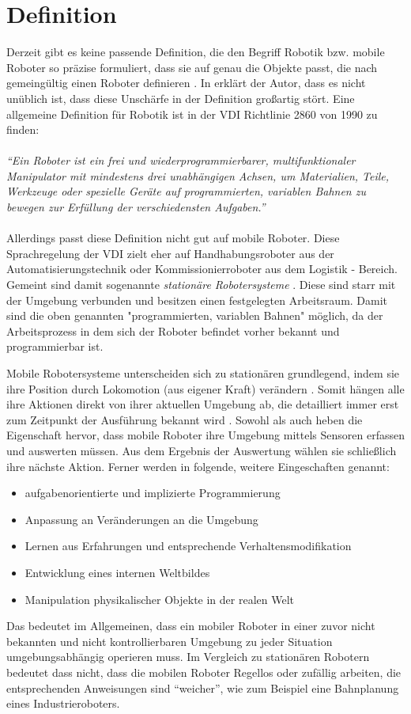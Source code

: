 \section{Definition}
Derzeit gibt es keine passende Definition, die den Begriff Robotik bzw. mobile Roboter so präzise formuliert, dass sie auf genau die Objekte passt, die nach gemeingültig einen Roboter definieren \cite{hertzberg2009mobile}. In \cite{hertzberg2009mobile} erklärt der Autor, dass es nicht unüblich ist, dass diese Unschärfe in der Definition großartig stört. Eine allgemeine Definition für Robotik ist in der \ac{VDI} Richtlinie 2860 von 1990 zu finden:
\\
\\
\textit{"`Ein Roboter ist ein frei und wiederprogrammierbarer, multifunktionaler Manipulator mit mindestens drei unabhängigen Achsen, um Materialien, Teile, Werkzeuge oder spezielle Geräte auf programmierten,
variablen Bahnen zu bewegen zur Erfüllung der verschiedensten Aufgaben."'}
\\
\\
Allerdings passt diese Definition nicht gut auf mobile Roboter. Diese Sprachregelung der \ac{VDI} zielt eher auf Handhabungsroboter aus der Automatisierungstechnik oder Kommissionierroboter aus dem Logistik - Bereich. Gemeint sind damit sogenannte \textit{stationäre Robotersysteme} \cite{Haun2007}. Diese sind starr mit der Umgebung verbunden und besitzen einen festgelegten Arbeitsraum. Damit sind die oben genannten "programmierten, variablen Bahnen" möglich, da der Arbeitsprozess in dem sich der Roboter befindet vorher bekannt und programmierbar ist. 

Mobile Robotersysteme unterscheiden sich zu stationären grundlegend, indem sie ihre Position durch Lokomotion (aus eigener Kraft) verändern \cite{Haun2007}. Somit hängen alle ihre Aktionen direkt von ihrer aktuellen Umgebung ab, die detailliert immer erst zum Zeitpunkt der Ausführung bekannt wird \cite{hertzberg2009mobile}. Sowohl \cite{hertzberg2009mobile} als auch \cite{Haun2007} heben die Eigenschaft hervor, dass mobile Roboter ihre Umgebung mittels Sensoren erfassen und auswerten müssen. Aus dem Ergebnis der Auswertung wählen sie schließlich ihre nächste Aktion. Ferner werden in \cite{Haun2007} folgende, weitere Eingeschaften genannt:
\begin{itemize}
\item aufgabenorientierte und implizierte Programmierung
\item Anpassung an Veränderungen an die Umgebung
\item Lernen aus Erfahrungen und entsprechende Verhaltensmodifikation
\item Entwicklung eines internen Weltbildes
\item Manipulation physikalischer Objekte in der realen Welt
\end{itemize}
Das bedeutet im Allgemeinen, dass ein mobiler Roboter in einer zuvor nicht bekannten und nicht kontrollierbaren Umgebung zu jeder Situation umgebungsabhängig operieren muss. Im Vergleich zu stationären Robotern bedeutet dass nicht, dass die mobilen Roboter Regellos oder zufällig arbeiten, die entsprechenden Anweisungen sind "`weicher"', wie zum Beispiel eine Bahnplanung eines Industrieroboters.

